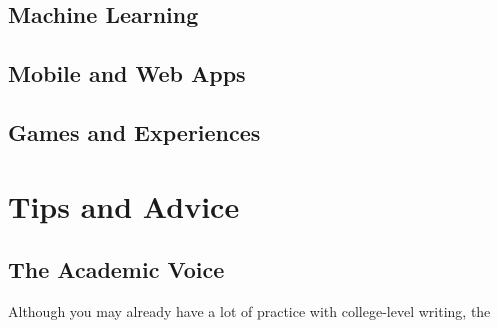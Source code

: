 \documentclass[10pt,twocolumn]{article}
\begin{document}
\subsection{Machine Learning}

\subsection{Mobile and Web Apps}

\subsection{Games and Experiences}

\section{Tips and Advice}

\subsection{The Academic Voice}

Although you may already have a lot of practice with college-level writing, the \cite{InkAndSwitch2022AcademishVoice}

\printbibliography

\appendix

\clearpage

\onecolumn
\end{document}
